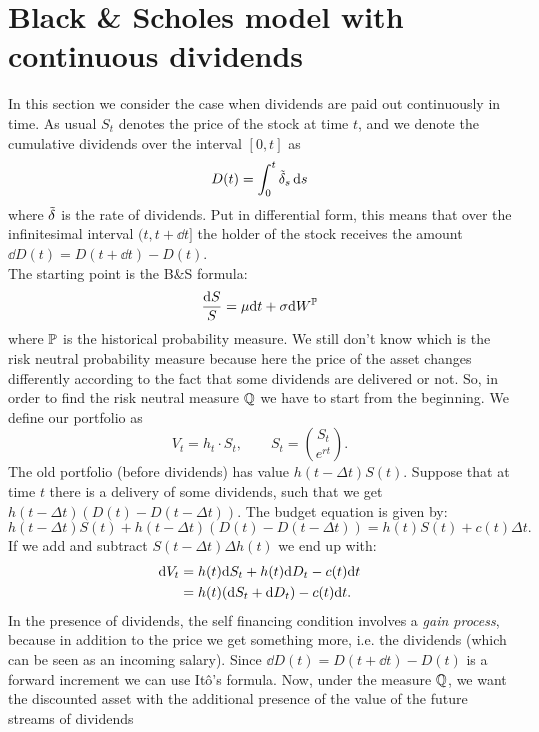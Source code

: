 \section{Black \& Scholes model with continuous dividends}\label{B&Swithdividends}
In this section we consider the case when dividends are paid out continuously in time. As usual $S_t$ denotes the price of the stock at time $t$, and we denote the cumulative dividends over the interval $[0,t]$ as
\begin{equation}
    D(t) = \int^t_0 \Tilde{\delta}_s \, \dd s
\end{equation}{}
where $\Tilde{\delta}$ is the rate of dividends. Put in differential form, this means that over the infinitesimal interval $(t, t + \dd t]$ the holder of the stock receives the amount $\dd D(t) = D(t + \dd t) - D(t)$.\\
The starting point is the B\&S formula:
\begin{equation}
    \dfrac{\dd S}{S} = \mu\dd t + \sigma \dd W^{\mathbb{P}}
\end{equation}
where $\mathbb{P}$ is the historical probability measure. We still don't know which is the risk neutral probability measure because here the price of the asset changes differently according to the fact that some dividends are delivered or not. So, in order to find the risk neutral measure $\mathbb{Q}$ we have to start from the beginning. We define our portfolio as
\begin{equation}
    V_t = h_t\cdot S_t, \qquad S_t = \binom{S_t}{e^{rt}}.
\end{equation}
The old portfolio (before dividends) has value $h(t-\Delta t)S(t)$. Suppose that at time $t$ there is a delivery of some dividends, such that we get $h(t-\Delta t)(D(t)-D(t-\Delta t))$. The budget equation is given by:
\begin{equation}
    h(t-\Delta t)S(t) + h(t-\Delta t)(D(t)-D(t-\Delta t)) = h(t)S(t) + c(t)\Delta t.
\end{equation}
If we add and subtract $S(t-\Delta t)\Delta h(t)$ we end up with:
\begin{align}
    \notag\dd V_t &= h(t)\dd S_t + h(t)\dd D_t - c(t)\dd t \\
    &=
    h(t)(\dd S_t + \dd D_t) - c(t)\dd t.
\end{align}
In the presence of dividends, the self financing condition involves a \emph{gain process}, because in addition to the price we get something more, i.e. the dividends (which can be seen as an incoming salary). Since $\dd D(t) = D(t + \dd t) - D(t)$ is a forward increment we can use Itô's formula. Now, under the measure $\mathbb{Q}$, we want the discounted asset with the additional presence of the value of the future streams of dividends
